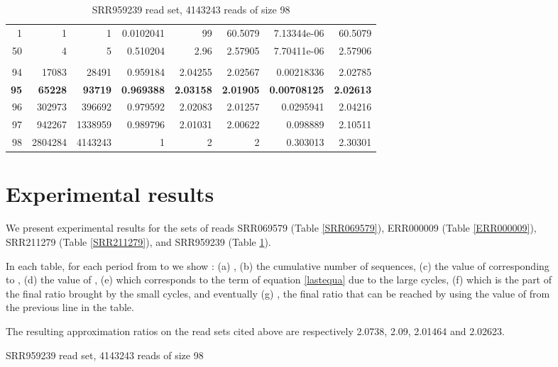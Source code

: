 \documentclass[10pt]{article}
\begin{document}
\begin{figure}[t]
\begin{centering}
\begin{table}[!htbp]
{\begin{tabular}{|rrrrrrrr|}
1&	1&	1&	0.0102041&	99&	60.5079&	7.13344e-06&	60.5079\\
50&	4&	5&	0.510204&	2.96	&2.57905&	7.70411e-06&	2.57906\\


 &  &  &  &  &  &   &  \\ 

94&	17083&	28491&	0.959184&	2.04255&	2.02567&	0.00218336&	2.02785\\
{\bf 95} &	{\bf 65228} &{\bf 93719} &{\bf 0.969388} &	{\bf 2.03158}&	{\bf 2.01905} &	{\bf 0.00708125} &	{\bf 2.02613}\\
96&	302973&	396692&	0.979592	&2.02083&	2.01257&	0.0295941&	2.04216\\
97&	942267&	1338959&	0.989796&	2.01031&	2.00622&	0.098889	&2.10511\\
98&	2804284&	4143243&	1&	2&	2&	0.303013&	2.30301\\


\hline
\end{tabular}
}
\clearpage{}
\caption{SRR959239 read set,  4143243 reads of size 98}
\label{SRR959239}
\end{table}

\section{Experimental results}
\label{exprest}

We present experimental results for the sets of reads SRR069579 (Table
\ref{SRR069579}), ERR000009 (Table \ref{ERR000009}), SRR211279 (Table
\ref{SRR211279}), and SRR959239 (Table \ref{SRR959239}). 

In each table, for each period  from  to  we show : (a)
, (b) the cumulative number of sequences, (c) the value of
 corresponding to , (d) the value of , (e)  which
corresponds to the term of equation \ref{lastequa} due to the large
cycles, (f)  which is the part of the
final ratio brought by the small cycles, and eventually (g) , the final ratio that can be reached by using the value of  from the
previous line in the table.


The resulting approximation ratios on the read sets cited above are
respectively 2.0738, 2.09, 2.01464 and 2.02623.

















\end{centering}
\end{figure}
\end{document}
